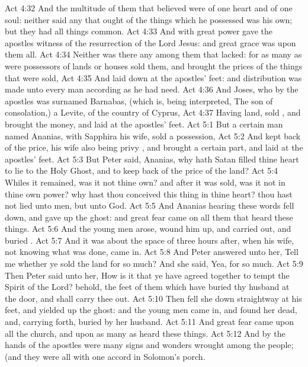 \vs Act 4:32 And the multitude of them that believed were of one heart and of one soul: neither said any  that ought of the things which he possessed was his own; but they had all things common.
\vs Act 4:33 And with great power gave the apostles witness of the resurrection of the Lord Jesus: and great grace was upon them all.
\vs Act 4:34 Neither was there any among them that lacked: for as many as were possessors of lands or houses sold them, and brought the prices of the things that were sold,
\vs Act 4:35 And laid  down at the apostles' feet: and distribution was made unto every man according as he had need.
\vs Act 4:36 And Joses, who by the apostles was surnamed Barnabas, (which is, being interpreted, The son of consolation,) a Levite,  of the country of Cyprus,
\vs Act 4:37 Having land, sold , and brought the money, and laid  at the apostles' feet.
\vs Act 5:1 But a certain man named Ananias, with Sapphira his wife, sold a possession,
\vs Act 5:2 And kept back  of the price, his wife also being privy , and brought a certain part, and laid  at the apostles' feet.
\vs Act 5:3 But Peter said, Ananias, why hath Satan filled thine heart to lie to the Holy Ghost, and to keep back  of the price of the land?
\vs Act 5:4 Whiles it remained, was it not thine own? and after it was sold, was it not in thine own power? why hast thou conceived this thing in thine heart? thou hast not lied unto men, but unto God.
\vs Act 5:5 And Ananias hearing these words fell down, and gave up the ghost: and great fear came on all them that heard these things.
\vs Act 5:6 And the young men arose, wound him up, and carried  out, and buried .
\vs Act 5:7 And it was about the space of three hours after, when his wife, not knowing what was done, came in.
\vs Act 5:8 And Peter answered unto her, Tell me whether ye sold the land for so much? And she said, Yea, for so much.
\vs Act 5:9 Then Peter said unto her, How is it that ye have agreed together to tempt the Spirit of the Lord? behold, the feet of them which have buried thy husband  at the door, and shall carry thee out.
\vs Act 5:10 Then fell she down straightway at his feet, and yielded up the ghost: and the young men came in, and found her dead, and, carrying  forth, buried  by her husband.
\vs Act 5:11 And great fear came upon all the church, and upon as many as heard these things.
\vs Act 5:12 And by the hands of the apostles were many signs and wonders wrought among the people; (and they were all with one accord in Solomon's porch.
